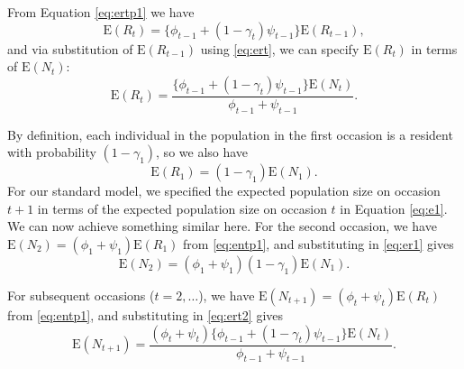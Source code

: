 \documentclass{article}
\newcommand{\E}[1]{\mathrm{E}(#1)}
\begin{document}
From Equation \eqref{eq:ertp1} we have
\begin{equation}
  \E{R_t} = \{ \phi_{t - 1} + (1 - \gamma_t) \psi_{t - 1}\} \E{R_{t - 1}}, \nonumber
\end{equation}
and via substitution of $\E{R_{t - 1}}$ using \eqref{eq:ert}, we can
specify $\E{R_t}$ in terms of $\E{N_t}$:
\begin{equation}
  \E{R_t} = \frac{\{ \phi_{t - 1} + (1 - \gamma_t) \psi_{t - 1}\}
    \E{N_t}}{\phi_{t - 1} + \psi_{t - 1}}. \label{eq:ert2}
\end{equation}

By definition, each individual in the population in the first occasion
is a resident with probability $(1 - \gamma_1)$, so we also have
\begin{equation}
\E{R_1} = (1 - \gamma_1) \E{N_1}. \label{eq:er1}
\end{equation}
For our standard model, we specified the expected population size on
occasion $t + 1$ in terms of the expected population size on occasion
$t$ in Equation \eqref{eq:e1}. We can now achieve something similar
here. For the second occasion, we have $\E{N_2} = (\phi_1 + \psi_1)
\E{R_1}$ from \eqref{eq:entp1}, and substituting in \eqref{eq:er1}
gives
\begin{equation}
  \E{N_2}  = (\phi_1 + \psi_1) (1 - \gamma_1) \E{N_1}.
\end{equation}

For subsequent occasions ($t = 2, \ldots$), we have $\E{N_{t + 1}} =
(\phi_t + \psi_t) \E{R_t}$ from \eqref{eq:entp1}, and substituting in
\eqref{eq:ert2} gives
\begin{equation}
  \E{N_{t + 1}} = \frac{(\phi_t + \psi_t) \{ \phi_{t - 1} + (1 - \gamma_t) \psi_{t - 1}\}
    \E{N_t}}{\phi_{t - 1} + \psi_{t - 1}}.
\end{equation}

 
\end{document}
